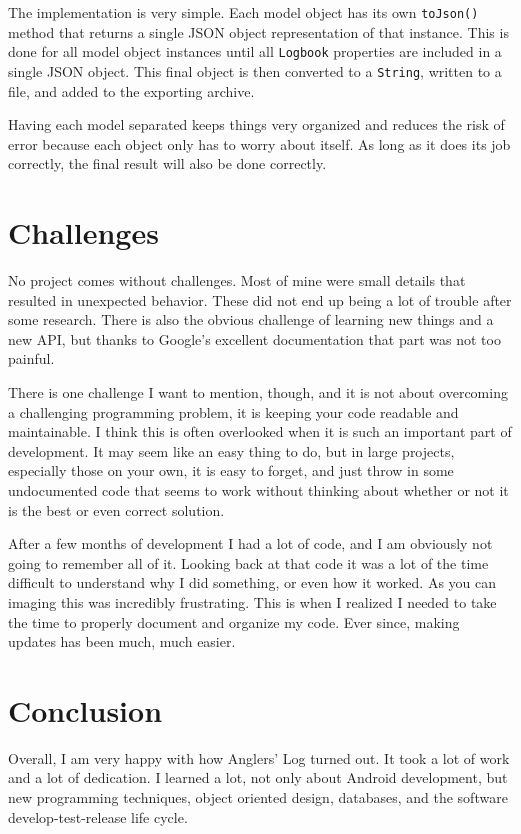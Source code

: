 \documentclass{article}
\begin{document}
	The implementation is very simple.  Each model object has its own \texttt{toJson()} method that returns a single JSON object representation of that instance.  This is done for all model object instances until all \texttt{Logbook} properties are included in a single JSON object.  This final object is then converted to a \texttt{String}, written to a file, and added to the exporting archive.

	Having each model separated keeps things very organized and reduces the risk of error because each object only has to worry about itself.  As long as it does its job correctly, the final result will also be done correctly.
	

	\section{Challenges}
	
	No project comes without challenges.  Most of mine were small details that resulted in unexpected behavior.  These did not end up being a lot of trouble after some research.  There is also the obvious challenge of learning new things and a new API, but thanks to Google's excellent documentation that part was not too painful.

	There is one challenge I want to mention, though, and it is not about overcoming a challenging programming problem, it is keeping your code readable and maintainable.  I think this is often overlooked when it is such an important part of development.  It may seem like an easy thing to do, but in large projects, especially those on your own, it is easy to forget, and just throw in some undocumented code that seems to work without thinking about whether or not it is the best or even correct solution.

	After a few months of development I had a lot of code, and I am obviously not going to remember all of it.  Looking back at that code it was a lot of the time difficult to understand why I did something, or even how it worked.  As you can imaging this was incredibly frustrating.  This is when I realized I needed to take the time to properly document and organize my code.  Ever since, making updates has been much, much easier.
	
	
	\section{Conclusion}
	
	Overall, I am very happy with how Anglers' Log turned out.  It took a lot of work and a lot of dedication.  I learned a lot, not only about Android development, but new programming techniques, object oriented design, databases, and the software develop-test-release life cycle.
\end{document}

